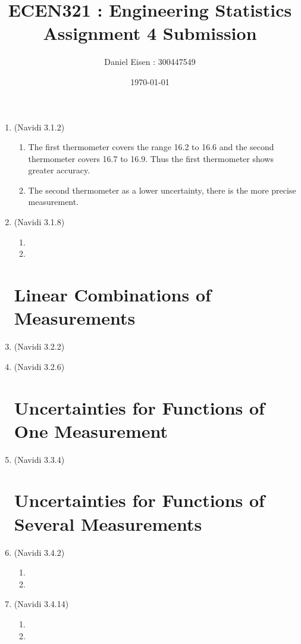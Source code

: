 \documentclass[11pt]{article}
\title{ECEN321 : Engineering Statistics \\ Assignment 4 Submission}
\author{Daniel Eisen : 300447549}
\date{\today}
\begin{document}
\maketitle
\begin{enumerate}
\section*{Measurement Error}
\item (Navidi 3.1.2) %
\begin{enumerate}
        \item The first thermometer covers the range 16.2 to 16.6 and the second thermometer covers 16.7 to 16.9. Thus the first thermometer shows greater accuracy.
        \item The second thermometer as a lower uncertainty, there is the more precise measurement.
\end{enumerate}

\item (Navidi 3.1.8) %
\begin{enumerate}
        \item 
        \item 
\end{enumerate} 

\section*{Linear Combinations of Measurements}
\item (Navidi 3.2.2)
\item (Navidi 3.2.6)

\section*{Uncertainties for Functions of One Measurement}
\item (Navidi 3.3.4)

\section*{Uncertainties for Functions of Several Measurements}
\item (Navidi 3.4.2)
\begin{enumerate}
        \item 
        \item 
\end{enumerate}

\item (Navidi 3.4.14)
\begin{enumerate}
        \item 
        \item 
\end{enumerate}

\end{enumerate}
\end{document}
